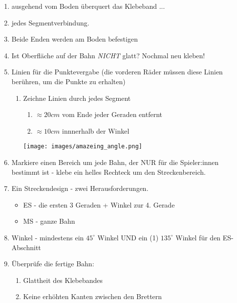 \documentclass[a4paper,12pt]{article}
\begin{document}
\begin{enumerate}
	\item ausgehend vom Boden überquert das Klebeband ...
	\item jedes Segmentverbindung.
	\item Beide Enden werden am Boden befestigen
	\item Ist Oberfläche auf der Bahn \emph{NICHT} glatt?
		Nochmal neu kleben!
	\item Linien für die Punktevergabe (die vorderen Räder müssen diese
		Linien berühren, um die Punkte zu erhalten)
	\begin{enumerate}
		\item Zeichne Linien durch jedes Segment
		\begin{enumerate}
			\item $\approx 20 cm$ vom Ende jeder Geraden entfernt
			\item $\approx 10 cm$ innnerhalb der Winkel
		\end{enumerate}
		\texttt{[image: images/amazeing\_angle.png]}
	\end{enumerate}
	\item Markiere einen Bereich um jede Bahn, der NUR für die
		Spieler:innen bestimmt ist - klebe ein helles Rechteck um den
		Streckenbereich.
	\item  Ein Streckendesign - zwei Herausforderungen.
	\begin{itemize}
		\item ES - die ersten 3 Geraden + Winkel zur 4.
			Gerade
		\item MS - ganze Bahn
	\end{itemize}
	\item Winkel - mindestens ein $45^{\circ}$ Winkel UND ein (1)
		$135^{\circ}$ Winkel für den ES-Abschnitt
	\item Überprüfe die fertige Bahn:
	\begin{enumerate}
		\item Glattheit des Klebebandes
		\item Keine erhöhten Kanten zwischen den Brettern
	\end{enumerate}
\end{enumerate}
\end{document}
